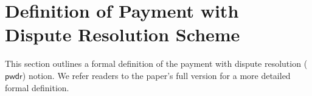 




\vspace{-3.3mm}
\section{ Definition of Payment with Dispute Resolution Scheme}\label{sec::def}
\vspace{-1mm}

This section outlines a formal definition of the payment with dispute resolution  ($\mathsf{pwdr}$) notion. We refer readers to the paper's full version \cite{PwDR-full-ver} for a more detailed formal definition. 
%
%
\vspace{-2.2mm}
